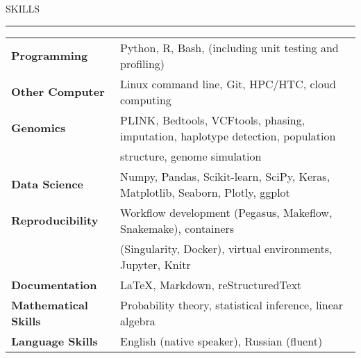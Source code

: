 \documentclass{resume} %
\renewenvironment{rSection}[1]{
\sectionskip
\textcolor{RoyalPurple}{\MakeUppercase{#1}}
\sectionlineskip
\hrule
\begin{list}{}{
\setlength{\leftmargin}{1.5em}
}
\item[]
}{
\end{list}
}
\begin{document}
\begin{rSection}{Skills}

\begin{tabular}{ @{} >{\bfseries}l @{\hspace{6ex}} l }
Programming & Python, R, Bash, (including unit testing and profiling)\\
Other Computer & Linux command line, Git, HPC/HTC, cloud computing  \\
Genomics & PLINK, Bedtools, VCFtools, phasing, imputation, haplotype detection, population \\ & structure, genome simulation\\
Data Science & Numpy, Pandas, Scikit-learn, SciPy, Keras, Matplotlib, Seaborn, Plotly, ggplot \\
Reproducibility & Workflow development (Pegasus, Makeflow, Snakemake), containers \\ & (Singularity, Docker), virtual environments, Jupyter, Knitr \\
Documentation & \LaTeX, Markdown, reStructuredText \\
Mathematical Skills & Probability theory, statistical inference, linear algebra \\
Language Skills & English (native speaker), Russian (fluent) \\
\end{tabular}

\end{rSection}

\end{document}

